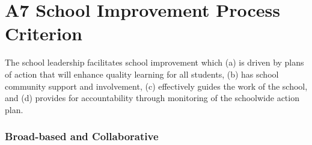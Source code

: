 \section{A7 School Improvement Process Criterion}

The school leadership facilitates school improvement which (a) is driven by plans of action that will enhance quality learning for all students, (b) has school community support and involvement, (c) effectively guides the work of the school, and (d) provides for accountability through monitoring of the schoolwide action plan.

\subsubsection{Broad-based and Collaborative}



